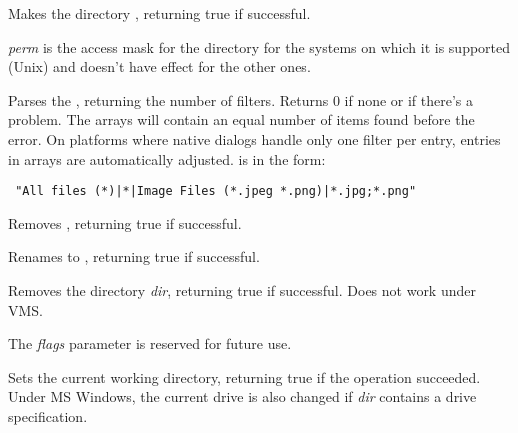 \label{wxmkdir}


Makes the directory , returning true if successful.

{\it perm} is the access mask for the directory for the systems on which it is
supported (Unix) and doesn't have effect for the other ones.


\label{wxparsecommondialogsfilter}


Parses the , returning the number of filters.
Returns 0 if none or if there's a problem.
The arrays will contain an equal number of items found before the error.
On platforms where native dialogs handle only one filter per entry,
entries in arrays are automatically adjusted.
 is in the form:
\begin{verbatim}
 "All files (*)|*|Image Files (*.jpeg *.png)|*.jpg;*.png"
\end{verbatim}

\label{wxremovefile}


Removes , returning true if successful.


\label{wxrenamefile}


Renames  to , returning true if successful.


\label{wxrmdir}


Removes the directory {\it dir}, returning true if successful. Does not work under VMS.

The {\it flags} parameter is reserved for future use.


\label{wxsetworkingdirectory}


Sets the current working directory, returning true if the operation succeeded.
Under MS Windows, the current drive is also changed if {\it dir} contains a drive specification.


